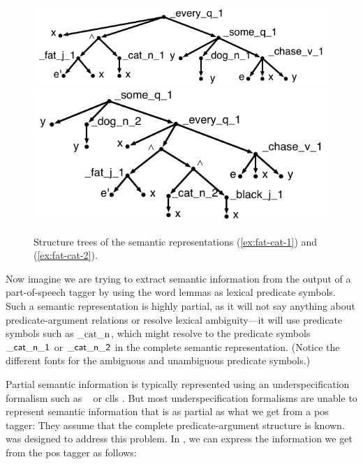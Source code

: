 \begin{figure}[t]
\centering
\includegraphics[scale=0.8]{pic-cat-chased-dog} \\
\includegraphics[scale=0.8]{pic-cat-chased-dog-2}
\caption{Structure trees of the semantic representations (\ref{ex:fat-cat-1}) and
  (\ref{ex:fat-cat-2}). \label{fig:1}}
\end{figure}


Now imagine we are trying to extract semantic information from the
output of a part-of-speech tagger by using the word lemmas as lexical
predicate symbols.  Such a semantic representation is highly partial,
as it will not say anything about predicate-argument relations or
resolve lexical ambiguity---it will use predicate symbols such as
$\mathrm{\_cat\_n}$, which might resolve to the predicate symbols
$\mathsf{\_cat\_n\_1}$ or $\mathsf{\_cat\_n\_2}$ in the complete semantic
representation.  (Notice the different fonts for the ambiguous and
unambiguous predicate symbols.)

Partial semantic information is
typically represented using an underspecification formalism such as
\mrs\ \cite{copestake:etal:2005} or {\sc clls} \cite{egg:etal:inpress}.  But
most underspecification formalisms are unable to represent semantic
information that is as partial as what we get from a {\sc pos} tagger: They
assume that the complete predicate-argument structure is known.
\rmrs\ \cite{copestake:2007a} was
designed to address this problem.  In \rmrs, we can express the
information we get from the {\sc pos} tagger as follows:

